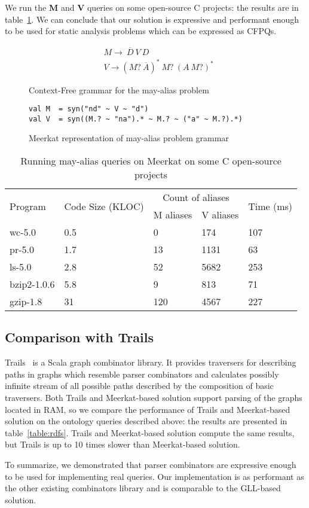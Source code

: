 We run the \textbf{M} and \textbf{V} queries on some open-source C projects: the results are in table~\ref{table:staticAnalysis}.
We can conclude that our solution is expressive and performant enough to be used for static analysis problems which can be expressed as CFPQs.

\begin{figure}[t]
\begin{align*}
& M \rightarrow\ \overline{D}\ V\ D\\
& V \rightarrow (M ?\ \overline{A})^{*} \ M?\ (A\ M?)^{*}
\end{align*}
\caption{Context-Free grammar for the may-alias problem}
\label{lst:aliasGrammar}
\end{figure}

\begin{figure}[h]
\begin{lstlisting}
val M  = syn("nd" ~ V ~ "d")
val V  = syn((M.? ~ "na").* ~ M.? ~ ("a" ~ M.?).*)
\end{lstlisting}
\caption{Meerkat representation of may-alias problem grammar}
\label{fig:aliasMeerkat}
\end{figure}


\begin{table}[t]
\centering
\begin{tabular}{|l|l|ll|l|}
\hline
\multirow{2}{*}{Program} & \multirow{2}{*}{Code Size (KLOC)} & \multicolumn{2}{c|}{Count of aliases} & \multirow{2}{*}{Time (ms)} \\ \cline{3-4}
 &  & \multicolumn{1}{c|}{M aliases} & \multicolumn{1}{c|}{V aliases} &  \\ 
\hline
\hline
wc-5.0      & 0.5 & 0   & 174  & 107 \\
pr-5.0      & 1.7 & 13  & 1131 & 63  \\
ls-5.0      & 2.8 & 52  & 5682 & 253 \\
bzip2-1.0.6 & 5.8 & 9   & 813  & 71  \\
gzip-1.8    & 31  & 120 & 4567 & 227 \\
\hline
\end{tabular}
\caption{Running may-alias queries on Meerkat on some C open-source projects}
\label{table:staticAnalysis}
\end{table}

\subsection{Comparison with Trails}

Trails~\cite{ScalaGraphParsing} is a Scala graph combinator library.
It provides traversers for describing paths in graphs which resemble parser combinators and calculates possibly infinite stream of all possible paths described by the composition of basic traversers.
Both Trails and Meerkat-based solution support parsing of the graphs located in RAM, so we compare the performance of Trails and Meerkat-based solution on the ontology queries described above: the results are presented in table~\ref{table:rdfs}.
Trails and Meerkat-based solution compute the same results, but Trails is up to 10 times slower than Meerkat-based solution.

To summarize, we demonstrated that parser combinators are expressive enough to be used for implementing real queries. 
Our implementation is as performant as the other existing combinators library and is comparable to the GLL-based solution.
